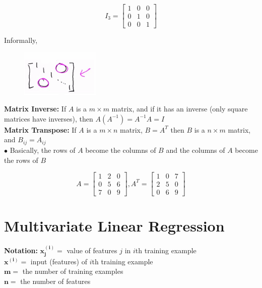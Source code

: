 \documentclass{article}
\begin{document}
        \begin{equation*}
            I_3 =
            \begin{bmatrix}
                1 & 0 & 0 \\
                0 & 1 & 0 \\
                0 & 0 & 1
            \end{bmatrix}
        \end{equation*}

        \noindent Informally,

        \begin{figure}[hbt!]
            \centering
            \includegraphics[scale=1.2]{Resources/Identity2}
        \end{figure}

        \noindent \textbf{Matrix Inverse:} If $A$ is a $m\times m$ matrix, and if it has an inverse
        (only square matrices have inverses), then $A(A^{-1})=A^{-1}A=I$ \\

        \noindent \textbf{Matrix Transpose:} If $A$ is a $m\times n$ matrix, $B=A^T$ then $B$ is a $n\times m$
        matrix, and $B_{ij}=A_{ij}$ \\
        $\bullet$ Basically, the rows of $A$ become the columns of $B$ and the columns of $A$ become the
        rows of $B$

        \begin{equation*}
            A =
            \begin{bmatrix}
                1 & 2 & 0 \\
                0 & 5 & 6 \\
                7 & 0 & 9
            \end{bmatrix}
            , A^T =
            \begin{bmatrix}
                1 & 0 & 7 \\
                2 & 5 & 0 \\
                0 & 6 & 9
            \end{bmatrix}
        \end{equation*}



    \pagebreak
    \section{Multivariate Linear Regression}
        \textbf{Notation:}
        $\bm{x_j^{(i)}}=$ value of features $j$ in $i$th training example \\
        $\bm{x^{(i)}}=$ input (features) of $i$th training example \\
        $\bm{m}=$ the number of training examples \\
        $\bm{n}=$ the number of features \\
\end{document}
